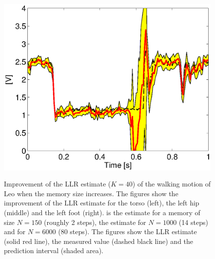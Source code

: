 \begin{figure}[htbp]
{\includegraphics[width=.3\textwidth]{Figures/LLR-LeoIncrMemStep_Foot2}
\label{fig:LLR-LeoIncrMemStep_N2}
}\\
\caption[\ac{LLR} estimate of Leo walking for increasing memory size]{Improvement of the \ac{LLR} estimate ($K=40$) of the walking motion of Leo when the memory size increases. The figures show the improvement of the \ac{LLR} estimate for the torso (left), the left hip (middle) and the left foot (right).  is the estimate for a memory of size $N=150$ (roughly 2 steps),  the estimate for $N=1000$ (14 steps) and  for $N=6000$ (80 steps). The figures show the \ac{LLR} estimate (solid red line), the measured value (dashed black line) and the prediction interval (shaded area).}
\label{fig:LLR-LeoIncrMemStep}
\end{figure}

